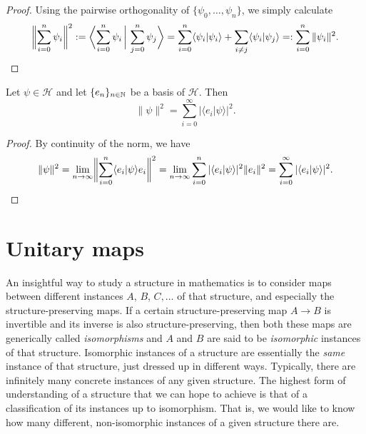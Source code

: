 \begin{proof}
Using the pairwise orthogonality of $\{\psi_0,\ldots,\psi_n\}$, we simply calculate 
\begin{equation*}
\biggl\|\sum_{i=0}^n \psi_i\biggr\|^2:=  \biggl\langle\sum_{i=0}^n \psi_i \, \bigg| \, \sum_{j=0}^n \psi_j \biggr\rangle=   \sum_{i=0}^n\langle \psi_i | \psi_i \rangle+ \sum_{i\neq j}\langle \psi_i | \psi_j \rangle =: \sum_{i=0}^n \|\psi_i\|^2. \qedhere
\end{equation*}
\end{proof}

\begin{corollary}
Let $\psi \in \mathcal{H}$ and let $\{e_n\}_{n\in \mathbb{N}}$ be a basis of $\mathcal{H}$. Then
\begin{equation*}
\|\psi\|^2 = \sum_{i=0}^{\infty}|\langle e_i | \psi\rangle|^2.
\end{equation*}
\end{corollary}

\begin{proof}
By continuity of the norm, we have
\begin{equation*}
\|\psi\|^2 = \lim_{n\to\infty}\biggl\|\sum_{i=0}^n\langle e_i | \psi\rangle e_i\biggr\|^2 = \lim_{n\to\infty}\sum_{i=0}^n|\langle e_i | \psi\rangle |^2\|e_i\|^2 =  \sum_{i=0}^{\infty}|\langle e_i | \psi\rangle|^2.\qedhere
\end{equation*}
\end{proof}


\section{Unitary maps}

An insightful way to study a structure in mathematics is to consider
maps between different instances $A$, $B$, $C,\ldots$ of that
structure, and especially the structure-preserving maps. If a certain
structure-preserving map $A\to B$ is invertible and its inverse is
also structure-preserving, then both these maps are generically called
\emph{isomorphisms} and $A$ and $B$ are said to be \emph{isomorphic}
instances of that structure. Isomorphic instances of a structure are
essentially the \emph{same} instance of that structure, just dressed
up in different ways.
Typically, there are infinitely many concrete instances of any given
structure. The highest form of understanding of a structure that we
can hope to achieve is that of a classification of its instances up to
isomorphism. That is, we would like to know how many different,
non-isomorphic instances of a given structure there are.

